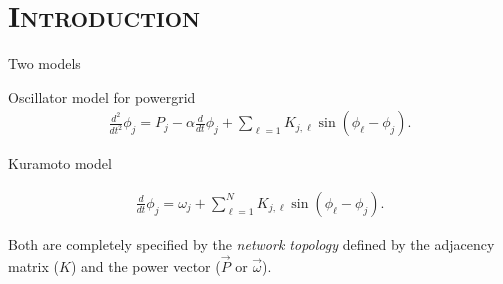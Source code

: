 \documentclass[xcolor=x11names,compress]{beamer}
\renewcommand{\(}{\begin{columns}}
\renewcommand{\)}{\end{columns}}
\newcommand{\<}[1]{\begin{column}{#1}}
\renewcommand{\>}{\end{column}}
\begin{document}
\section{\scshape Introduction}

\begin{frame}{Two models}
\begin{block}{Oscillator model for powergrid}
\begin{eqnarray*}
   \frac{d^2}{dt^2} \phi_j = P_j - \alpha  \frac{d}{dt}\phi_j
             + \sum_{\ell = 1} K _{j,\ell} \sin(\phi_\ell - \phi_j). 
  \label{eqn:power}
\end{eqnarray*}
\end{block}

\begin{block}{Kuramoto model}

\begin{eqnarray*}
   \frac{d}{dt} \phi_j = \omega_j  + \sum_{\ell = 1}^N
      K _{j,\ell} \sin(\phi_\ell - \phi_j).
   \label{eqn:kuramoto}
\end{eqnarray*}
\end{block}

Both are completely specified by the \emph{network topology} defined by the 
adjacency matrix ($K$) and the power vector ($\vec{P}$ or $\vec{\omega}$).  
\end{frame}
\end{document}
